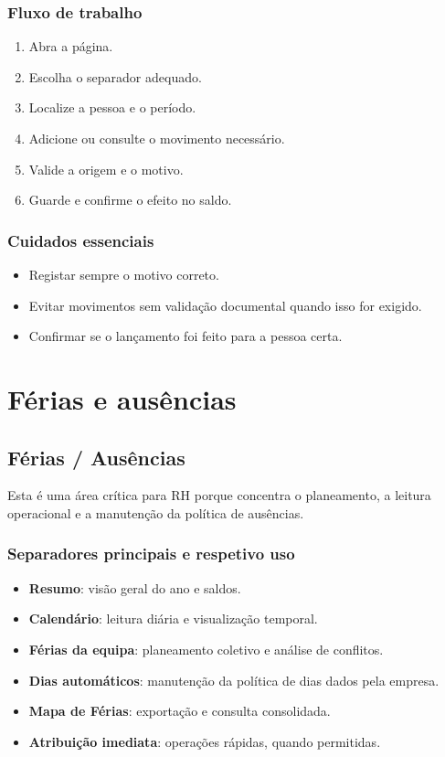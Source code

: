 \subsection{Fluxo de trabalho}
\begin{enumerate}
  \item Abra a página.
  \item Escolha o separador adequado.
  \item Localize a pessoa e o período.
  \item Adicione ou consulte o movimento necessário.
  \item Valide a origem e o motivo.
  \item Guarde e confirme o efeito no saldo.
\end{enumerate}

\subsection{Cuidados essenciais}
\begin{itemize}
  \item Registar sempre o motivo correto.
  \item Evitar movimentos sem validação documental quando isso for exigido.
  \item Confirmar se o lançamento foi feito para a pessoa certa.
\end{itemize}

\chapter{Férias e ausências}
\section{Férias / Ausências}
Esta é uma área crítica para RH porque concentra o planeamento, a leitura operacional e a manutenção da política de ausências.

\subsection{Separadores principais e respetivo uso}
\begin{itemize}
  \item \textbf{Resumo}: visão geral do ano e saldos.
  \item \textbf{Calendário}: leitura diária e visualização temporal.
  \item \textbf{Férias da equipa}: planeamento coletivo e análise de conflitos.
  \item \textbf{Dias automáticos}: manutenção da política de dias dados pela empresa.
  \item \textbf{Mapa de Férias}: exportação e consulta consolidada.
  \item \textbf{Atribuição imediata}: operações rápidas, quando permitidas.
\end{itemize}

